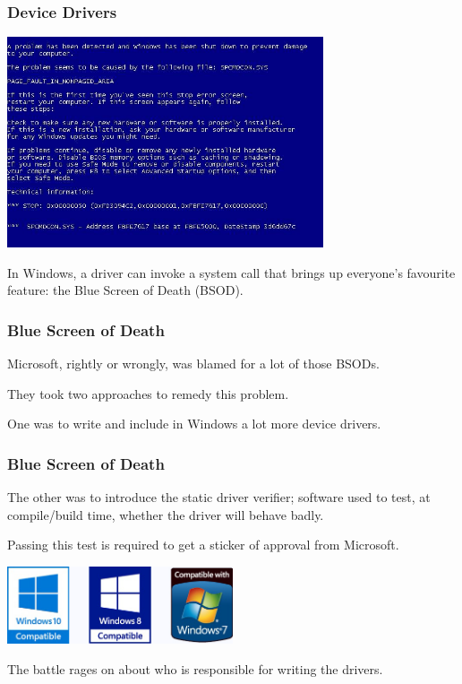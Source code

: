 \begin{frame}
\frametitle{Device Drivers}

\begin{center}
	\includegraphics[width=0.7\textwidth]{images/bsod.jpg}
\end{center}

In Windows, a driver can invoke a system call that brings up everyone's favourite feature: the Blue Screen of Death (BSOD).

\end{frame}

\begin{frame}
\frametitle{Blue Screen of Death}

Microsoft, rightly or wrongly, was blamed for a lot of those BSODs. 

They took two approaches to remedy this problem. 

One was to write and include in Windows a lot more device drivers. 

\end{frame}

\begin{frame}
\frametitle{Blue Screen of Death}

The other was to introduce the static driver verifier; software used to test, at compile/build time, whether the driver will behave badly. 

Passing this test is required to get a sticker of approval from Microsoft.

\begin{center}
	\includegraphics[width=0.5\textwidth]{images/wqhl.jpg}
\end{center}

The battle rages on about who is responsible for writing the drivers.


\end{frame}

